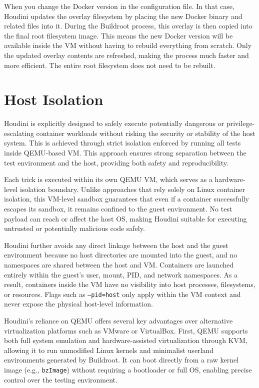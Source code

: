 \documentclass[12pt]{report}
\begin{document}
\begin{doublespace}
When you change the Docker version in the configuration file. In that case, Houdini updates the overlay filesystem by placing the new Docker binary and related files into it. During the Buildroot process, this overlay is then copied into the final root filesystem image. This means the new Docker version will be available inside the VM without having to rebuild everything from scratch. Only the updated overlay contents are refreshed, making the process much faster and more efficient. The entire root filesystem does not need to be rebuilt.


\section{Host Isolation}

Houdini is explicitly designed to safely execute potentially dangerous or privilege-escalating container workloads without risking the security or stability of the host system. This is achieved through strict isolation enforced by running all tests inside QEMU-based VM. This approach ensures strong separation between the test environment and the host, providing both safety and reproducibility.

Each trick is executed within its own QEMU VM, which serves as a hardware-level isolation boundary. Unlike approaches that rely solely on Linux container isolation, this VM-level sandbox guarantees that even if a container successfully escapes its sandbox, it remains confined to the guest environment. No test payload can reach or affect the host OS, making Houdini suitable for executing untrusted or potentially malicious code safely.

Houdini further avoids any direct linkage between the host and the guest environment because no host directories are mounted into the guest, and no namespaces are shared between the host and VM. Containers are launched entirely within the guest’s user, mount, PID, and network namespaces. As a result, containers inside the VM have no visibility into host processes, filesystems, or resources. Flags such as \texttt{--pid=host} only apply within the VM context and never expose the physical host-level information.

Houdini’s reliance on QEMU offers several key advantages over alternative virtualization platforms such as VMware or VirtualBox. First, QEMU supports both full system emulation and hardware-assisted virtualization through KVM, allowing it to run unmodified Linux kernels and minimalist userland environments generated by Buildroot. It can boot directly from a raw kernel image (e.g., \texttt{bzImage}) without requiring a bootloader or full OS, enabling precise control over the testing environment.


\end{doublespace}
\end{document}
